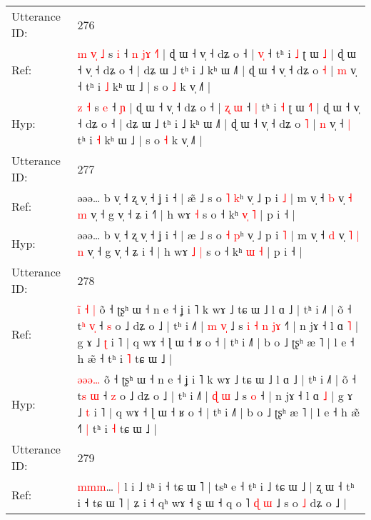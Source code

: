 \documentclass[10pt]{article}
\DeclareRobustCommand{\hl}[1]{{\textcolor{red}{#1}}}
\begin{document}
\begin{longtable}{ll}
 \\
\midrule
Utterance ID: & 276 \\
Ref: & \hl{m}\hl{ }\hl{v}\hl{̩} \hl{˩} s \hl{i} ˧\hl{ }\hl{n}\hl{ }\hl{j}\hl{ɤ} \hl{˧}\hl{˥} | ɖ ɯ ˧ v̩ ˧ dʑ o ˧ | \hl{}\hl{v}\hl{̩} ˧\hl{}\hl{} tʰ i \hl{˩} ʈ ɯ \hl{}\hl{˩} | ɖ ɯ ˧ v̩ ˧ dʑ o ˧ | dʑ ɯ ˩ tʰ i ˩ kʰ ɯ ˩˥ | ɖ ɯ ˧ v̩ ˧ dʑ o \hl{˧} | \hl{m} v̩ ˧\hl{}\hl{} tʰ i \hl{˩} kʰ ɯ ˩ | s o \hl{˩} k v̩ ˩˥ |
 \\
Hyp: & \hl{}\hl{}\hl{}\hl{z} \hl{˧} s \hl{e} ˧\hl{}\hl{}\hl{}\hl{}\hl{} \hl{}\hl{ɲ} | ɖ ɯ ˧ v̩ ˧ dʑ o ˧ | \hl{ʐ}\hl{ }\hl{ɯ} ˧\hl{ }\hl{|} tʰ i \hl{˧} ʈ ɯ \hl{˧}\hl{˥} | ɖ ɯ ˧ v̩ ˧ dʑ o ˧ | dʑ ɯ ˩ tʰ i ˩ kʰ ɯ ˩˥ | ɖ ɯ ˧ v̩ ˧ dʑ o \hl{˥} | \hl{n} v̩ ˧\hl{ }\hl{|} tʰ i \hl{˧} kʰ ɯ ˩ | s o \hl{˧} k v̩ ˩˥ |
 \\
\midrule
Utterance ID: & 277 \\
Ref: & əəə… b v̩ ˧ ʐ v̩ ˧ ʝ i ˧ | æ\hl{̃} ˩ s o \hl{˥} \hl{k}ʰ v̩ ˩ p i \hl{˩} | m v̩ ˧ \hl{b} v̩\hl{}\hl{} \hl{˧} \hl{m} v̩ ˧ g v̩ ˧ ʑ i ˧\hl{˥} | h wɤ\hl{}\hl{} \hl{˧} s o ˧ kʰ \hl{v}\hl{̩} \hl{˥} | p i ˧ |
 \\
Hyp: & əəə… b v̩ ˧ ʐ v̩ ˧ ʝ i ˧ | æ\hl{} ˩ s o \hl{˧} \hl{p}ʰ v̩ ˩ p i \hl{˥} | m v̩ ˧ \hl{d} v̩\hl{ }\hl{˥} \hl{|} \hl{n} v̩ ˧ g v̩ ˧ ʑ i ˧\hl{} | h wɤ\hl{ }\hl{˩} \hl{|} s o ˧ kʰ \hl{}\hl{ɯ} \hl{˧} | p i ˧ |
 \\
\midrule
Utterance ID: & 278 \\
Ref: & \hl{i}\hl{̃}\hl{ }\hl{˧}\hl{ }\hl{|} õ ˧ ʈʂʰ ɯ ˧ n e ˧ ʝ i ˥ k wɤ ˩ tɕ ɯ ˩ l ɑ ˩ | tʰ i ˩˥ | õ ˧ t\hl{ʰ} \hl{v}\hl{̩} ˧ \hl{s} o ˩ dʑ o ˩ | tʰ i ˩˥ | \hl{m} \hl{v}\hl{̩} ˩ s\hl{ }\hl{i}\hl{ }\hl{˧}\hl{ }\hl{n} \hl{j}\hl{ɤ} ˧\hl{˥} | n jɤ ˧ l ɑ \hl{˥} | g ɤ ˩ \hl{ʈ} i ˥ | q wɤ ˧ ɭ ɯ ˧ ʁ o ˧ | tʰ i ˩˥ | b o ˩ ʈʂʰ æ ˥ | l e ˧ h æ̃ ˧\hl{}\hl{}\hl{} tʰ i \hl{˥} tɕ ɯ ˩ |
 \\
Hyp: & \hl{}\hl{}\hl{ə}\hl{ə}\hl{ə}\hl{…} õ ˧ ʈʂʰ ɯ ˧ n e ˧ ʝ i ˥ k wɤ ˩ tɕ ɯ ˩ l ɑ ˩ | tʰ i ˩˥ | õ ˧ t\hl{s} \hl{}\hl{ɯ} ˧ \hl{z} o ˩ dʑ o ˩ | tʰ i ˩˥ | \hl{ɖ} \hl{}\hl{ɯ} ˩ s\hl{}\hl{}\hl{}\hl{}\hl{}\hl{} \hl{}\hl{o} ˧\hl{} | n jɤ ˧ l ɑ \hl{˩} | g ɤ ˩ \hl{t} i ˥ | q wɤ ˧ ɭ ɯ ˧ ʁ o ˧ | tʰ i ˩˥ | b o ˩ ʈʂʰ æ ˥ | l e ˧ h æ̃ ˧\hl{˥}\hl{ }\hl{|} tʰ i \hl{˧} tɕ ɯ ˩ |
 \\
\midrule
Utterance ID: & 279 \\
Ref: & \hl{m}\hl{m}\hl{m}… \hl{|} l i ˩ tʰ i ˧ tɕ ɯ ˥ | tsʰ e ˧ tʰ i ˩ tɕ ɯ ˩ | ʐ ɯ ˧ tʰ i ˧ tɕ ɯ ˥ | ʑ i ˧ qʰ wɤ ˧ ʂ ɯ ˧ q o ˥\hl{}\hl{} \hl{ɖ} \hl{}\hl{ɯ} ˩ \hl{}s o \hl{˩} dʑ o ˩ |
 \\

\end{longtable}
\end{document}
